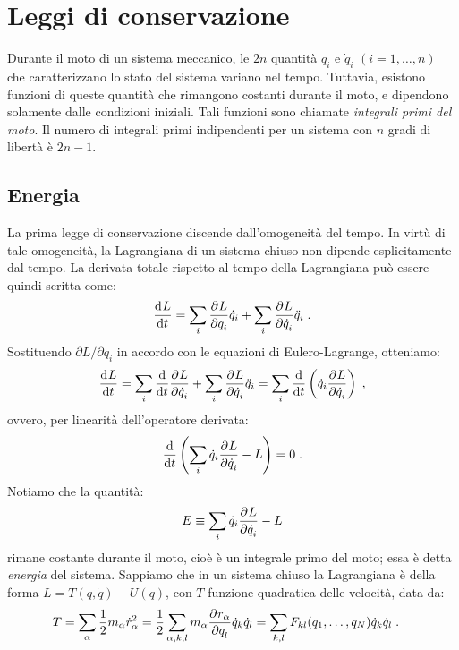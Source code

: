 \section{Leggi di conservazione}
Durante il moto di un sistema meccanico, le $2n$ quantità $q_i$ e $\dot{q}_i$ $(i=1,\ldots,n)$ che caratterizzano lo stato del sistema variano nel tempo. Tuttavia, esistono funzioni di queste quantità che rimangono costanti durante il moto, e dipendono solamente dalle condizioni iniziali. Tali funzioni sono chiamate \textit{integrali primi del moto}. Il numero di integrali primi indipendenti per un sistema con $n$ gradi di libertà è $2n-1$.
\subsection{Energia}
La prima legge di conservazione discende dall'omogeneità del tempo. In virtù di tale omogeneità, la Lagrangiana di un sistema chiuso non dipende esplicitamente dal tempo. La derivata totale rispetto al tempo della Lagrangiana può essere quindi scritta come:
\begin{equation}
\frac{\mathrm{d}^{}L}{\mathrm{d}t^{}}=\sum_i\frac{\partial^{}L}{\partial q_i^{}}\dot{q}_i+\sum_i\frac{\partial^{}L}{\partial \dot{q}_i^{}}\ddot{q}_i\;.
\end{equation}
Sostituendo $\partial L/\partial q_i$ in accordo con le equazioni di Eulero-Lagrange, otteniamo:
\begin{equation}
\frac{\mathrm{d}^{}L}{\mathrm{d}t^{}} =\sum_i\frac{\mathrm{d}}{\mathrm{d}{t}}\frac{\partial^{}L}{\partial \dot{q}_i^{}}+\sum_i\frac{\partial^{}L}{\partial \dot{q}_i^{}}\ddot{q}_i=\sum_i\frac{\mathrm{d}}{\mathrm{d}{t}}\left(\dot{q}_i\frac{\partial^{}L}{\partial \dot{q}_i^{}}\right)\;,
\end{equation}
ovvero, per linearità dell'operatore derivata:
\begin{equation}
\frac{\mathrm{d}}{\mathrm{d}{t}}\left(\sum_i\dot{q}_i\frac{\partial^{}L}{\partial \dot{q}_i^{}}-L\right)=0\;.
\end{equation}
Notiamo che la quantità:
\begin{equation}
E\equiv \sum_i \dot{q}_i\frac{\partial^{}L}{\partial \dot{q}_i^{}}-L \label{sec3_energy}
\end{equation}
rimane costante durante il moto, cioè è un integrale primo del moto; essa è detta \textit{energia} del sistema. Sappiamo che in un sistema chiuso la Lagrangiana è della forma $L=T(q,\dot{q})-U(q)$, con $T$ funzione quadratica delle velocità, data da:
\begin{align}
T &= \sum_{\alpha}\frac{1}{2}m_{\alpha}\dot{r}_{\alpha}^2=\frac{1}{2}\sum_{\alpha,k,l}m_{\alpha}\frac{\partial^{}r_{\alpha}}{\partial q_l^{}}\dot{q}_k\dot{q}_l=\sum_{k,l}F_{kl}(q_1,\ldots,q_N)\dot{q}_k\dot{q}_l\;.
\end{align}
